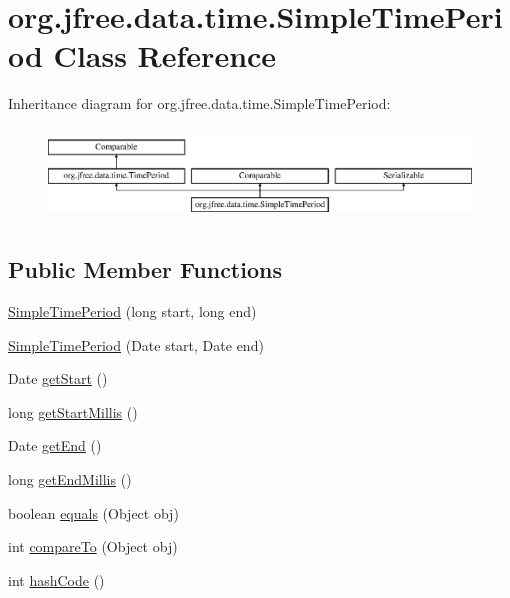 \hypertarget{classorg_1_1jfree_1_1data_1_1time_1_1_simple_time_period}{}\section{org.\+jfree.\+data.\+time.\+Simple\+Time\+Period Class Reference}
\label{classorg_1_1jfree_1_1data_1_1time_1_1_simple_time_period}
Inheritance diagram for org.\+jfree.\+data.\+time.\+Simple\+Time\+Period\+:\begin{figure}[H]
\begin{center}
\leavevmode
\includegraphics[height=2.466960cm]{classorg_1_1jfree_1_1data_1_1time_1_1_simple_time_period}
\end{center}
\end{figure}
\subsection*{Public Member Functions}
\begin{DoxyCompactItemize}
\item 
\mbox{\hyperlink{classorg_1_1jfree_1_1data_1_1time_1_1_simple_time_period_a389b9f6b4826d714b30dadb9e28b6e04}{Simple\+Time\+Period}} (long start, long end)
\item 
\mbox{\hyperlink{classorg_1_1jfree_1_1data_1_1time_1_1_simple_time_period_a94de9a015c3f3e1add30f776938d104b}{Simple\+Time\+Period}} (Date start, Date end)
\item 
Date \mbox{\hyperlink{classorg_1_1jfree_1_1data_1_1time_1_1_simple_time_period_aad32b7d42e1b0da520b2101321601142}{get\+Start}} ()
\item 
long \mbox{\hyperlink{classorg_1_1jfree_1_1data_1_1time_1_1_simple_time_period_a9ead4c8717504b46e185666e8165a45e}{get\+Start\+Millis}} ()
\item 
Date \mbox{\hyperlink{classorg_1_1jfree_1_1data_1_1time_1_1_simple_time_period_afb5fba801200f718c01519eced7ed921}{get\+End}} ()
\item 
long \mbox{\hyperlink{classorg_1_1jfree_1_1data_1_1time_1_1_simple_time_period_a737d71745c5a0b48f92c4ed025a42551}{get\+End\+Millis}} ()
\item 
boolean \mbox{\hyperlink{classorg_1_1jfree_1_1data_1_1time_1_1_simple_time_period_a63370386f066e52bd7fbb388ff27cfd3}{equals}} (Object obj)
\item 
int \mbox{\hyperlink{classorg_1_1jfree_1_1data_1_1time_1_1_simple_time_period_a35fc33fff28858317ef7cfd357e4f166}{compare\+To}} (Object obj)
\item 
int \mbox{\hyperlink{classorg_1_1jfree_1_1data_1_1time_1_1_simple_time_period_ad47c7e4b3f685ee75b8e7dfa67ccda60}{hash\+Code}} ()
\end{DoxyCompactItemize}


